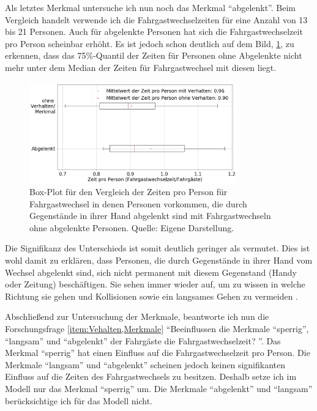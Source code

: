 Als letztes Merkmal untersuche ich nun noch das Merkmal "`abgelenkt"'. Beim Vergleich handelt verwende ich die Fahrgastwechselzeiten für eine Anzahl von 13 bis 21 Personen. Auch für abgelenkte Personen hat sich die Fahrgastwechselzeit pro Person scheinbar erhöht. Es ist jedoch schon deutlich auf dem Bild, \figurename \ref{fig:BoxPlotAbgelenkt}, zu erkennen, dass das 75\%-Quantil der Zeiten für Personen ohne Abgelenkte nicht mehr unter dem Median der Zeiten für Fahrgastwechsel mit diesen liegt.
\begin{figure}[H]
	\centering
		\includegraphics[width=0.8\textwidth]{pictures/data_evaluation/behavior/comp_Abgelenkt.png}
	\caption{Box-Plot für den Vergleich der Zeiten pro Person für Fahrgastwechsel in denen Personen vorkommen, die durch Gegenstände in ihrer Hand abgelenkt sind mit Fahrgastwechseln ohne abgelenkte Personen. Quelle: Eigene Darstellung.}
	\label{fig:BoxPlotAbgelenkt}
\end{figure}
Die Signifikanz des Unterschieds ist somit deutlich geringer als vermutet. Dies ist wohl damit zu erklären, dass Personen, die durch Gegenstände in ihrer Hand vom Wechsel abgelenkt sind, sich nicht permanent mit diesem Gegenstand (\zB Handy oder Zeitung) beschäftigen. Sie sehen immer wieder auf, um zu wissen in welche Richtung sie gehen und Kollisionen sowie ein langsames Gehen zu vermeiden .

Abschließend zur Untersuchung der Merkmale, beantworte ich nun die Forschungsfrage \ref{item:Vehalten,Merkmale} "`Beeinflussen die Merkmale "`sperrig"', "`langsam"' und "`abgelenkt"' der Fahrgäste die Fahrgastwechselzeit? "'. Das Merkmal "`sperrig"' hat einen Einfluss auf die Fahrgastwechselzeit pro Person. Die Merkmale "`langsam"' und "`abgelenkt"' scheinen jedoch keinen signifikanten Einfluss auf die Zeiten des Fahrgastwechsels zu besitzen. Deshalb setze ich im Modell nur das Merkmal "`sperrig"' um. Die Merkmale "`abgelenkt"' und "`langsam"' berücksichtige ich für das Modell nicht. 

